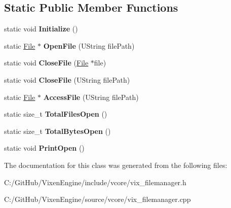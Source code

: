 \subsection*{Static Public Member Functions}
\begin{DoxyCompactItemize}
\item 
\hypertarget{class_vixen_1_1_file_manager_a08c92eccb870242ecd5b3dbfb757f225}{}static void {\bfseries Initialize} ()\label{class_vixen_1_1_file_manager_a08c92eccb870242ecd5b3dbfb757f225}

\item 
\hypertarget{class_vixen_1_1_file_manager_a45f15095623024b6d6b572b5020079aa}{}static \hyperlink{class_vixen_1_1_file}{File} $\ast$ {\bfseries Open\+File} (U\+String file\+Path)\label{class_vixen_1_1_file_manager_a45f15095623024b6d6b572b5020079aa}

\item 
\hypertarget{class_vixen_1_1_file_manager_a5234580d0ccf8c9c69097ab18d7a037b}{}static void {\bfseries Close\+File} (\hyperlink{class_vixen_1_1_file}{File} $\ast$file)\label{class_vixen_1_1_file_manager_a5234580d0ccf8c9c69097ab18d7a037b}

\item 
\hypertarget{class_vixen_1_1_file_manager_a36342248ec7f83ff8917a6a210707266}{}static void {\bfseries Close\+File} (U\+String file\+Path)\label{class_vixen_1_1_file_manager_a36342248ec7f83ff8917a6a210707266}

\item 
\hypertarget{class_vixen_1_1_file_manager_a6f2939cb810556b9cc6ef63b0f7131e8}{}static \hyperlink{class_vixen_1_1_file}{File} $\ast$ {\bfseries Access\+File} (U\+String file\+Path)\label{class_vixen_1_1_file_manager_a6f2939cb810556b9cc6ef63b0f7131e8}

\item 
\hypertarget{class_vixen_1_1_file_manager_a24f3391617b3a6889edb0bf98c197411}{}static size\+\_\+t {\bfseries Total\+Files\+Open} ()\label{class_vixen_1_1_file_manager_a24f3391617b3a6889edb0bf98c197411}

\item 
\hypertarget{class_vixen_1_1_file_manager_ac7e82ebccf035b802c726ec9ccc7e813}{}static size\+\_\+t {\bfseries Total\+Bytes\+Open} ()\label{class_vixen_1_1_file_manager_ac7e82ebccf035b802c726ec9ccc7e813}

\item 
\hypertarget{class_vixen_1_1_file_manager_a07fbcfc6054fae53de098a5f123076b5}{}static void {\bfseries Print\+Open} ()\label{class_vixen_1_1_file_manager_a07fbcfc6054fae53de098a5f123076b5}

\end{DoxyCompactItemize}


The documentation for this class was generated from the following files\+:\begin{DoxyCompactItemize}
\item 
C\+:/\+Git\+Hub/\+Vixen\+Engine/include/vcore/vix\+\_\+filemanager.\+h\item 
C\+:/\+Git\+Hub/\+Vixen\+Engine/source/vcore/vix\+\_\+filemanager.\+cpp\end{DoxyCompactItemize}
